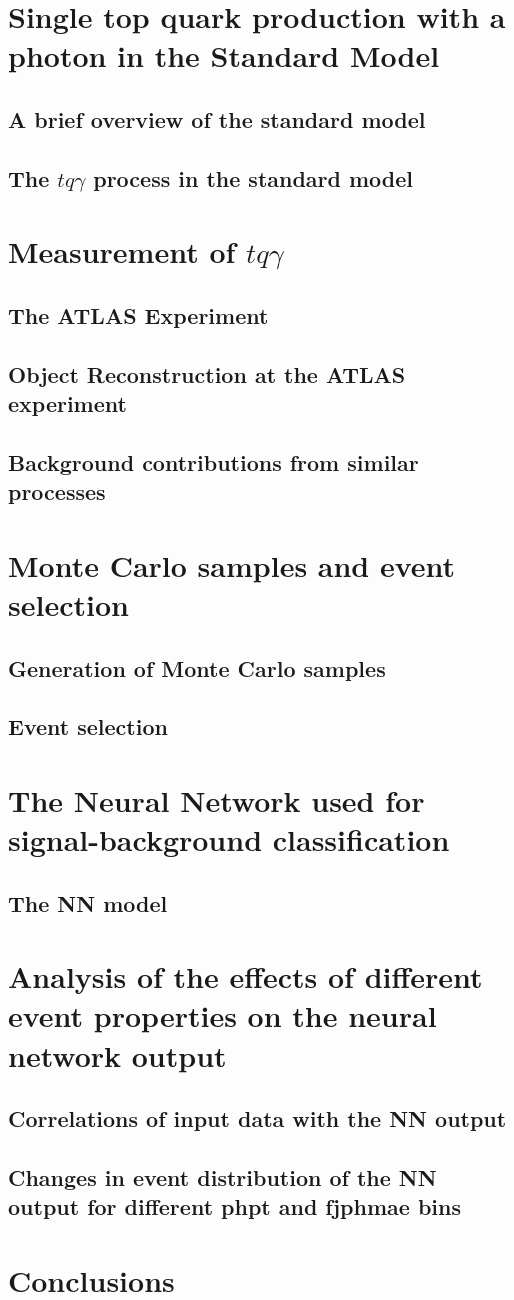 \chapter{Single top quark production with a photon in the Standard Model}
\section{A brief overview of the standard model}
\section{The \texorpdfstring{$tq\gamma$}{TEXT} process in the standard model}
\chapter{Measurement of \texorpdfstring{$tq\gamma$}{TEXT}}
\section{The ATLAS Experiment}
\section{Object Reconstruction at the ATLAS experiment}
\section{Background contributions from similar processes}
\chapter{Monte Carlo samples and event selection}
\section{Generation of Monte Carlo samples}
\section{Event selection}
\chapter{The Neural Network used for signal-background classification}
\section{The NN model}
\section{}
\chapter{Analysis of the effects of different event properties on the neural network output}
\section{Correlations of input data with the NN output}
\section{Changes in event distribution of the NN output for different phpt and fjphmae bins}
\chapter{Conclusions}
